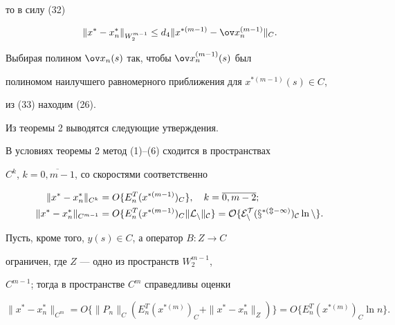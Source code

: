 \begin{pf}
то в силу (32)


\begin{equation}


\| x^* - x_n^* \|_{W_2^{m-1}} \leq d_4 \| x^{*(m-1)} - \ov x_n^{


(m-1)} \|_{C}.


\end{equation}


Выбирая полином $ \ov x_n(s) $ так, чтобы $ \ov x_n^{(m-1)}(s) $ был


полиномом наилучшего равномерного приближения для $ x^{*(m-1)}(s) \in C $,


из (33) находим (26).


\end{pf}





Из теоремы 2 выводятся следующие утверждения.





\begin{cor}


В условиях теоремы 2 метод (1)--(6) сходится в пространствах


$C^k$, $k=\overline{0,m-1}$, со скоростями соответственно


\begin{align}


\| x^* - x_n^* \|_{C^k} &=O \lbrace E_n^T


(x^{*(m-1)})_{C} \rbrace, \quad k=\overline{0,m-2}; \\


%


\| x^* - x_n^* \|_{C^{m-1}} &=O \lbrace E_n^T


(x^{*(m-1)})_{C} \| \rL_n \|_{C} \rbrace=


O \lbrace E_n^T(x^{*(m-1)})_{C} \ln n \rbrace.


\end{align}


Пусть, кроме того, $y(s) \in C $, а оператор $ B:Z \to C$


ограничен, где $Z$ --- одно из пространств $W_2^{m-1}$,


$C^{m-1}$; тогда в пространстве $ C^m $ справедливы оценки


\begin{equation}


\| x^* - x_n^* \|_{C^m}=O \lbrace \|


P_n \|_{C} (E_n^T(x^{*(m)})_{C} + \|


x^* - x_n^* \|_Z) \rbrace=


O \lbrace E_n^T (x^{*(m)})_{C} \ln n \rbrace.


\end{equation}


\end{cor}








